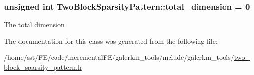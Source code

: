 \subsubsection[{\texorpdfstring{total\+\_\+dimension}{total_dimension}}]{\setlength{\rightskip}{0pt plus 5cm}unsigned int Two\+Block\+Sparsity\+Pattern\+::total\+\_\+dimension = 0\hspace{0.3cm}{\ttfamily [private]}}\hypertarget{class_two_block_sparsity_pattern_aa560457e8b8bf7a06acf6b19987c5ee0}{}\label{class_two_block_sparsity_pattern_aa560457e8b8bf7a06acf6b19987c5ee0}
The total dimension 

The documentation for this class was generated from the following file\+:\begin{DoxyCompactItemize}
\item 
/home/sst/\+F\+E/code/incremental\+F\+E/galerkin\+\_\+tools/include/galerkin\+\_\+tools/\hyperlink{two__block__sparsity__pattern_8h}{two\+\_\+block\+\_\+sparsity\+\_\+pattern.\+h}\end{DoxyCompactItemize}
